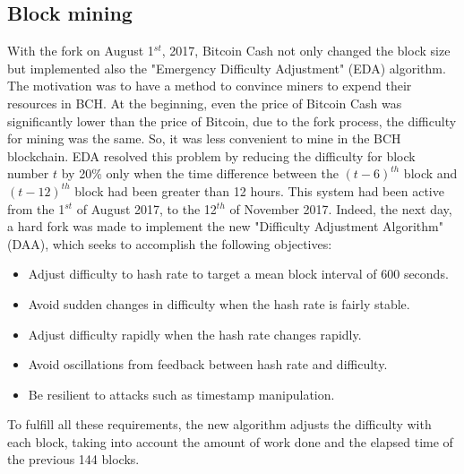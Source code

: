 \subsection{Block mining}
\label{sec:mining}

With the fork on August 1$^{st}$, 2017, Bitcoin Cash not only changed the block size but 
implemented also the "Emergency Difficulty Adjustment" (EDA) algorithm. The motivation was 
to have a method to convince miners to expend their resources in BCH. At the 
beginning, even the price of Bitcoin Cash was significantly lower than the price of 
Bitcoin, due to the fork process, the difficulty for mining was the same. So, it was 
less convenient to mine in the BCH blockchain. EDA resolved this problem by reducing 
the difficulty for block number $t$ by 20\% only when the time difference between the 
$(t-6)^{th}$ block and $(t-12)^{th}$ block had been greater than 12 hours. This system had been 
active from the 1$^{st}$ of August 2017, to the 12$^{th}$ of November 2017. Indeed, the next day, a hard fork
was made to implement the new "Difficulty Adjustment Algorithm" (DAA), which seeks to 
accomplish the following objectives:
\begin{itemize}
    \item Adjust difficulty to hash rate to target a mean block interval of 600 seconds.
    \item Avoid sudden changes in difficulty when the hash rate is fairly stable.
    \item Adjust difficulty rapidly when the hash rate changes rapidly.
    \item Avoid oscillations from feedback between hash rate and difficulty.
    \item Be resilient to attacks such as timestamp manipulation.
\end{itemize}
To fulfill all these requirements, the new algorithm adjusts the difficulty with each
block, taking into account the amount of work done and the elapsed time of the previous 
144 blocks.\cite{bitcoinabc}\cite{eda}\pagebreak
